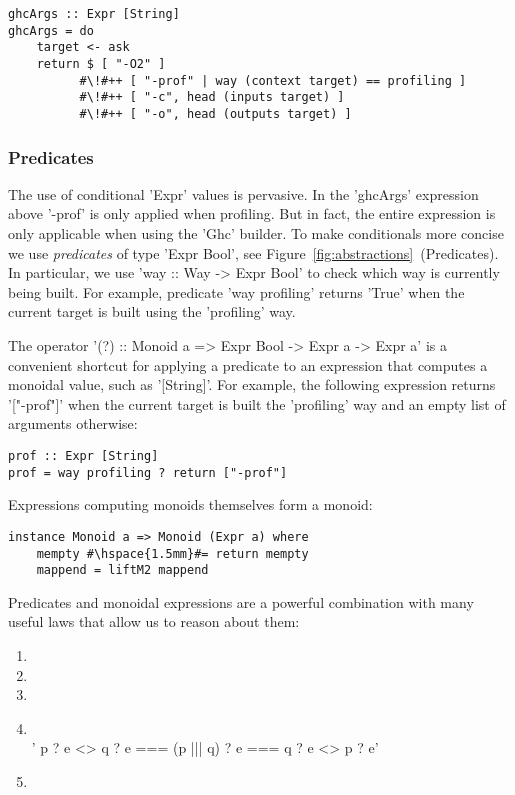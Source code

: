 \begin{lstlisting}
ghcArgs :: Expr [String]
ghcArgs = do
    target <- ask
    return $ [ "-O2" ]
          #\!#++ [ "-prof" | way (context target) == profiling ]
          #\!#++ [ "-c", head (inputs target) ]
          #\!#++ [ "-o", head (outputs target) ]
\end{lstlisting}

\subsubsection{Predicates}

The use of conditional \lst'Expr' values is pervasive. In the \lst'ghcArgs' expression
above \lst'-prof' is only applied when profiling. But in fact, the entire expression
is only applicable when using the \lst'Ghc' builder. To make conditionals more concise
we use \emph{predicates} of type \lst'Expr Bool', see
Figure~\ref{fig:abstractions}~(Predicates). In particular, we
use \lst'way :: Way -> Expr Bool' to check which way is currently being built.
For example, predicate \lst'way profiling' returns \lst'True' when the
current target is built using the \lst'profiling' way.

The operator \lst'(?) :: Monoid a => Expr Bool -> Expr a -> Expr a' is a
convenient shortcut for applying a predicate to an expression that computes a monoidal value, such
as \lst'[String]'. For example, the following expression returns
\lst'["-prof"]' when the current target is built the \lst'profiling' way and an
empty list of arguments otherwise:

\begin{lstlisting}
prof :: Expr [String]
prof = way profiling ? return ["-prof"]
\end{lstlisting}

Expressions computing monoids themselves form a monoid:

\begin{lstlisting}
instance Monoid a => Monoid (Expr a) where
    mempty #\hspace{1.5mm}#= return mempty
    mappend = liftM2 mappend
\end{lstlisting}

\noindent Predicates and monoidal expressions are a powerful combination with
many useful laws that allow us to reason about them:
\begin{enumerate}
  \item {} 
  \item {} 
  \item {} 
  \item {}  \vspace{1mm}\\
  \lst'    p ? e <> q ? e === (p ||| q) ? e === q ? e <> p ? e'
  \item {} 
\end{enumerate}

